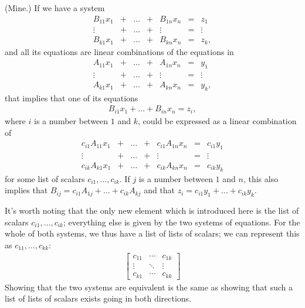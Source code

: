 \documentclass[12pt]{article}
\begin{document}
\begin{comm}
  (Mine.) If we have a system
  \[
  \begin{array}{ccccccc}
    B_{11}x_1 & + & \ldots & + & B_{1n}x_n & = & z_1\\
    \vdots    & + & \ldots & + & \vdots    & = & \vdots\\
    B_{k1}x_1 & + & \ldots & + & B_{kn}x_n & = & z_k,
  \end{array}
  \]
  and all its equations are linear combinations of the equations
  in
  \[
  \begin{array}{ccccccc}
    A_{11}x_1 & + & \ldots & + & A_{1n}x_n & = & y_1\\
    \vdots    & + & \ldots & + & \vdots    & = & \vdots\\
    A_{k1}x_1 & + & \ldots & + & A_{kn}x_n & = & y_k,
  \end{array}
  \]
  that implies that one of its equations
  \begin{align*}
    B_{i1}x_1 + \ldots + B_{in}x_n = z_i,
  \end{align*}
  where $i$ is a number between $1$ and $k$, could be expressed
  as a linear combination of
  \[
  \begin{array}{ccccccc}
    c_{i1}A_{11}x_1 & + & \ldots & + & c_{i1}A_{1n}x_n & = & c_{i1}y_1\\
    \vdots    & + & \ldots & + & \vdots    & = & \vdots\\
    c_{ik}A_{k1}x_1 & + & \ldots & + & c_{ik}A_{kn}x_n & = & c_{ik}y_k
  \end{array}
  \]
  for some list of scalars $c_{i1}, ..., c_{ik}$. If $j$ is a
  number between $1$ and $n$, this also implies that $B_{ij} =
  c_{i1}A_{1j} + \ldots + c_{ik}A_{kj}$ and that $z_{i} =
  c_{i1}y_{1} + \ldots + c_{ik}y_{k}$.

  It's worth noting that the only new element which is introduced
  here is the list of scalars $c_{i1}, \ldots, c_{ik}$; everything
  else is given by the two systems of equations. For the whole of
  both systems, we thus have a list of lists of scalars; we can
  represent this as $c_{11}, \ldots, c_{kk}$:
  \begin{align*}
    \begin{bmatrix}
      c_{11} & \cdots & c_{1k}\\
      \vdots & \ddots & \vdots\\
      c_{k1} & \cdots & c_{kk}
    \end{bmatrix}
  \end{align*}
  Showing that the two systems are equivalent is the same as
  showing that such a list of lists of scalars exists going in
  both directions.
\end{comm}
\end{document}
